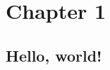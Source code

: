 \documentclass[../../document.tex]{subfiles}
\begin{document}
\chapter{Chapter 1}
\section{Hello, world!}
\end{document}
